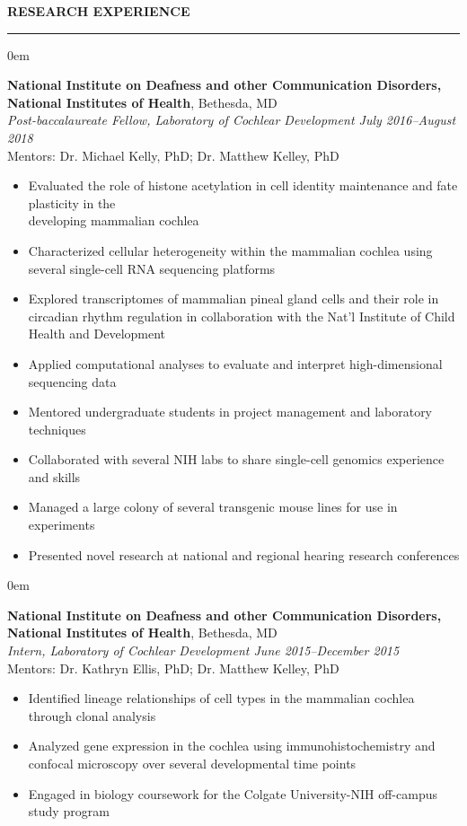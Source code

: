 \documentclass[11pt, letterpaper]{article}
\newenvironment{CVSection}{
\begin{addmargin}[2em]{0em}
\begin{samepage}}
{\end{samepage}
\end{addmargin}\bigskip}
\newcommand{\CVHeading}[1]{
\MakeUppercase{\bf #1}
\smallskip
\hrule
\medskip
}
\begin{document}
\CVHeading{Research Experience}
\begin{CVSection}
\textbf{National Institute on Deafness and other Communication Disorders,\\National Institutes of Health}, Bethesda, MD\\
\textsl{Post-baccalaureate Fellow, Laboratory of Cochlear Development	\hfill July 2016--August 2018\\}
Mentors: Dr. Michael Kelly, PhD; Dr. Matthew Kelley, PhD
\begin{itemize}
\item Evaluated the role of histone acetylation in cell identity maintenance and fate plasticity in the\\ developing mammalian cochlea
\item Characterized cellular heterogeneity within the mammalian cochlea using several single-cell RNA sequencing platforms
\item Explored transcriptomes of mammalian pineal gland cells and their role in circadian rhythm regulation in collaboration with the Nat'l Institute of Child Health and Development
\item Applied computational analyses to evaluate and interpret high-dimensional sequencing data
\item Mentored undergraduate students in project management and laboratory techniques
\item Collaborated with several NIH labs to share single-cell genomics experience and skills
\item Managed a large colony of several transgenic mouse lines for use in experiments
\item Presented novel research at national and regional hearing research conferences
\end{itemize}
\end{CVSection}
\begin{CVSection}
\textbf{National Institute on Deafness and other Communication Disorders,\\National Institutes of Health}, Bethesda, MD\\
\textsl{Intern, Laboratory of Cochlear Development	\hfill June 2015--December 2015\\}
Mentors: Dr. Kathryn Ellis, PhD; Dr. Matthew Kelley, PhD
\begin{itemize}
\item Identified lineage relationships of cell types in the mammalian cochlea through clonal analysis
\item Analyzed gene expression in the cochlea using immunohistochemistry and confocal microscopy over several developmental time points
\item Engaged in biology coursework for the Colgate University-NIH off-campus study program
\end{itemize}
\end{CVSection}
\end{document}
